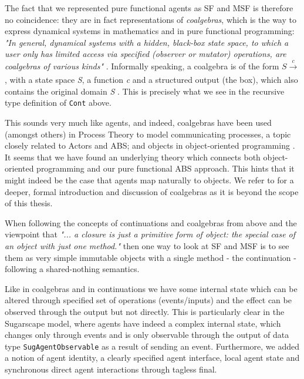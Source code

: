 The fact that we represented pure functional agents as SF and MSF is therefore no coincidence: they are in fact representations of \textit{coalgebras}, which is the way to express dynamical systems in mathematics and in pure functional programming: \textit{"In general, dynamical systems with a hidden, black-box state space, to which a user only has limited access via specified (observer or mutator) operations, are coalgebras of various kinds"} \cite{jacobs_tutorial_1997}. Informally speaking, a coalgebra is of the form $S \xrightarrow[\text{}]{c} $ , with a state space \textit{S}, a function \textit{c} and a structured output (the box), which also contains the original domain \textit{S} \cite{jacobs_introduction_2017}. This is precisely what we see in the recursive type definition of \texttt{Cont} above.

This sounds very much like agents, and indeed, coalgebras have been used (amongst others) in Process Theory to model communicating processes, a topic closely related to Actors and ABS; and objects in object-oriented programming \cite{jacobs_coalgebras_2003}. It seems that we have found an underlying theory which connects both object-oriented programming and our pure functional ABS approach. This hints that it might indeed be the case that agents map naturally to objects. We refer to \cite{jacobs_introduction_2017, jacobs_tutorial_1997} for a deeper, formal introduction and discussion of coalgebras as it is beyond the scope of this thesis.


When following the concepts of continuations and coalgebras from above and the viewpoint that \textit{"... a closure is just a primitive form of object: the special case of an object with just one method."} \cite{kaminski_messageoriented} then one way to look at SF and MSF is to see them as very simple immutable objects with a single method - the continuation - following a shared-nothing semantics. 

Like in coalgebras and in continuations we have some internal state which can be altered through specified set of operations (events/inputs) and the effect can be observed through the output but not directly. This is particularly clear in the Sugarscape model, where agents have indeed a complex internal state, which changes only through events and is only observable through the output of data type \texttt{SugAgentObservable} as a result of sending an event. Furthermore, we added a notion of agent identity, a clearly specified agent interface, local agent state and synchronous direct agent interactions through tagless final.

